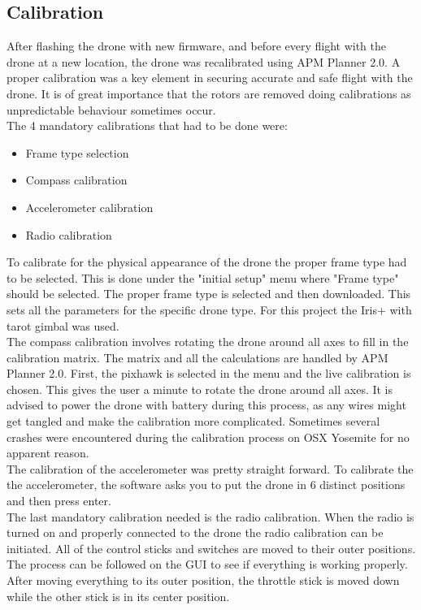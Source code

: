 \subsection*{Calibration}
After flashing the drone with new firmware, and before every flight with the drone at a new location,
the drone was recalibrated using APM Planner 2.0.
A proper calibration was a key element in securing accurate and safe
flight with the drone. It is of great importance that the rotors are removed doing calibrations as
unpredictable behaviour sometimes occur.\\
The 4 mandatory calibrations that had to be done were:
\begin{itemize}
\item Frame type selection
\item Compass calibration
\item Accelerometer calibration
\item Radio calibration
\end{itemize}

To calibrate for the physical appearance of the drone the proper frame type had to be selected.
This is done under the "initial setup" menu where "Frame type" should be selected. The proper frame
type
is selected and then downloaded. This sets all the parameters for the specific drone type. For this
project the Iris+ with tarot gimbal was used.\\

The compass calibration involves rotating the drone around all axes to fill in the calibration
matrix. The matrix and all the calculations are handled by APM Planner 2.0. First, the pixhawk is
selected in the menu and the live calibration is chosen. This gives the user a minute to rotate the
drone around all axes. It is advised to power the drone with battery during this process,
as any wires might get tangled
and make the calibration more complicated.
Sometimes several crashes were encountered during the
calibration process on OSX Yosemite for no apparent reason.\\

The calibration of the accelerometer was pretty straight forward. To calibrate the the
accelerometer, the software asks you to put the drone in 6 distinct positions and then press enter.\\

The last mandatory calibration needed is the radio calibration. When the radio is turned on and
properly connected to the drone the radio calibration can be initiated. All of the control sticks
and switches are moved to their outer positions. The process can be followed on the GUI to see if
everything is working properly. After moving everything to its outer position, the throttle stick is
moved down while the other stick is in its center position.\\

